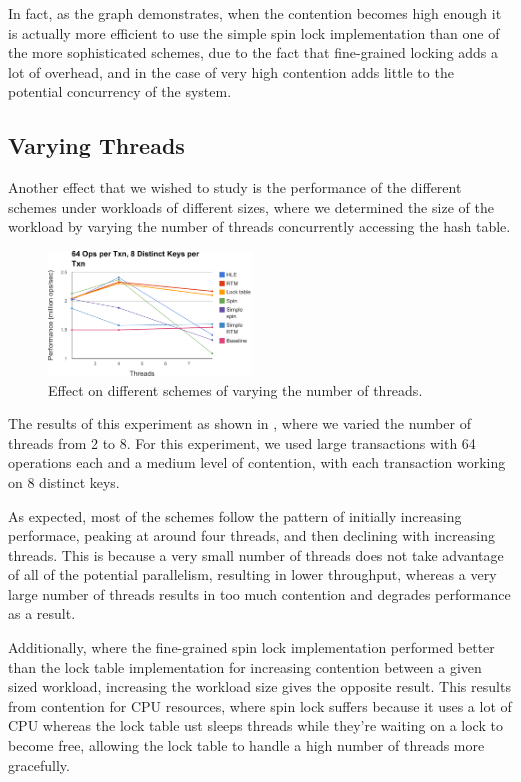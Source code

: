 In fact, as the graph demonstrates, when the contention becomes high enough it 
is actually more efficient to use the simple spin lock implementation than one of 
the more sophisticated schemes, due to the fact that fine-grained locking adds a lot 
of overhead, and in the case of very high contention adds little to the potential 
concurrency of the system.

\subsection{Varying Threads}

Another effect that we wished to study is the performance of the different schemes 
under workloads of different sizes, where we determined the size of the workload 
by varying the number of threads concurrently accessing the hash table.

\begin{figure}[h!]
  \centering
  \includegraphics[width=0.48\textwidth]{figure/threads.pdf}
  \caption{Effect on different schemes of varying the number of threads.}
  \label{fig:threads} 
\end{figure}

The results of this experiment as shown in , where we varied the number 
of threads from 2 to 8. For this experiment, we used large transactions with 64 
operations each and a medium level of contention, with each transaction working on 
8 distinct keys.

As expected, most of the schemes follow the pattern of initially increasing performace, 
peaking at around four threads, and then declining with increasing threads. This is 
because a very small number of threads does not take advantage of all of the potential 
parallelism, resulting in lower throughput, whereas a very large number of threads 
results in too much contention and degrades performance as a result.

Additionally, where the fine-grained spin lock implementation performed better than 
the lock table implementation for increasing contention between a given sized 
workload, increasing the workload size gives the opposite result. This results from 
contention for CPU resources, where spin lock suffers because it uses a lot of CPU 
whereas the lock table ust sleeps threads while they're waiting on a lock to become 
free, allowing the lock table to handle a high number of threads more gracefully.

